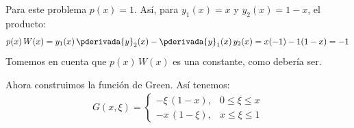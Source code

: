 Para este problema $p (x) = 1$. Así, para $y_{1} (x) = x$ y $y_{2} (x) = 1 - x$, el producto:
\begin{align*}
p (x) \, W (x) =  y_{1} (x) \, \pderivada{y}_{2} (x) - \pderivada{y}_{1} (x) \, y_{2} (x) = x (-1) -  1(1 - x) = - 1
\end{align*}
Tomemos en cuenta que $p (x) \, W (x)$ es una constante, como debería ser.
\par
Ahora construimos la función de Green. Así tenemos:
\begin{align}
G (x, \xi) = \begin{cases}
- \xi \, (1 - x), & 0 \leq \xi \leq x \\
- x \, (1 - \xi), & x \leq \xi \leq 1
\end{cases}
\label{eq:ecuacion_07_35}
\end{align}

